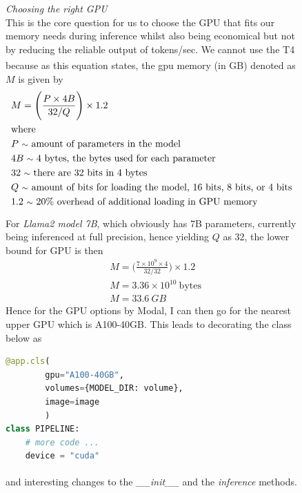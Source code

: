 \documentclass[12pt]{article}
\newcommand{\customtext}[3]{%
    \vspace{#2} %
    \fontsize{13}{8}\textcolor{#1}{\textit{#3}}%
}
\newcommand{\sidecite}[1]{\textsuperscript{\textcolor{blue}{\textbf{\scriptsize#1}}}}
\newcommand{\maincitecount}{\sidecite{\stepcounter{maincite}\themaincite}}
\begin{document}
\begin{figure}[!htb]
    \begin{minipage}[t]{0.65\textwidth}
    \raggedright
    \customtext{xtitle}{0em}{Choosing the right GPU}\\
This is the core question for us to choose the GPU that fits our memory needs during inference whilst also 
being economical but not by reducing the reliable output of tokens/sec. We cannot use the T4 because as this 
equation states{\maincitecount}, the gpu memory (in GB) denoted as $M$ is given by 
\begin{align*}
    & M = \Bigg(\frac{P\times4B}{32/Q}\Bigg)\times1.2\\
    & \text{where}\\
    & P\ \text{\footnotesize $\sim$}\ \text{amount of parameters in the model}\\
    & 4B\ \text{\footnotesize $\sim$}\ \text{4 bytes, the bytes used for each parameter}\\
    & 32\ \text{\footnotesize $\sim$}\ \text{there are 32 bits in 4 bytes}\\
    & Q\ \text{\footnotesize $\sim$}\ \text{amount of bits for loading the model, 16 bits, 8 bits, or 4 bits}\\
    & 1.2\ \text{\footnotesize $\sim$}\ \text{20\% overhead of additional loading in GPU memory}
\end{align*}
For {\it Llama2 model 7B}, which obviously has 7B{\maincitecount} parameters, currently being inferenced at full precision, 
hence yielding $Q$ as 32, the lower bound for GPU is then 
\begin{align*}
    &M=\Bigg(\frac{7\times10^9\times4}{32/32}\Bigg)\times1.2\\
    &M = 3.36\times10^{10}\ \text{bytes}\\
    &M = 33.6\ GB
\end{align*}
Hence for the GPU options by Modal, I can then go for the nearest upper GPU which is A100-40GB. This leads to 
decorating the class below as 
\begin{lstlisting}[language=python,style=python,basicstyle=\ttfamily\footnotesize]
@app.cls(
        gpu="A100-40GB", 
        volumes={MODEL_DIR: volume}, 
        image=image
        )
class PIPELINE:
    # more code ...
    device = "cuda"
\end{lstlisting}
and interesting changes to the {\it \footnotesize \_\_init\_\_} and the {\it \footnotesize inference} 
methods{\maincitecount}.
\end{minipage}%

\end{figure}
\end{document}
